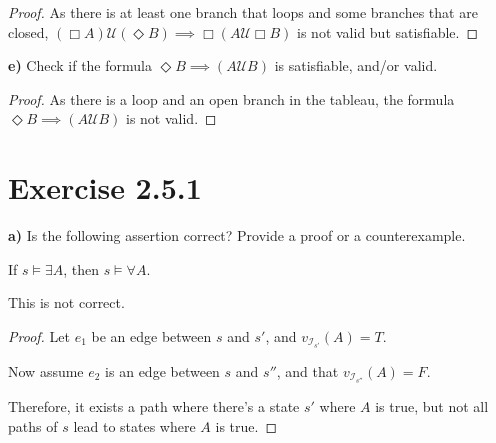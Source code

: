 \documentclass[titlepage, letterpaper, fleqn]{article}
\newcommand{\spacepls}{\vspace{5mm}}
\newcommand{\until}{\mathscr{U}}
\begin{document}
\begin{proof}
As there is at least one branch that loops and some branches that are closed, \((\Box A)\until(\Diamond B) \implies \Box(A \until \Box B)\)
is not valid but satisfiable.
\end{proof}

\pagebreak

{\large \textbf{e)} Check if the formula \(\Diamond B \implies (A \until B)\) is satisfiable, and/or valid.}

\spacepls


\begin{proof}
As there is a loop and an open branch in the tableau, the formula \(\Diamond B \implies (A \until B)\) is not valid.
\end{proof}

\section{Exercise 2.5.1}

{\large \textbf{a)} Is the following assertion correct? Provide a proof or a counterexample.

If \(s \models \exists A\), then \(s \models \forall A\).}

\spacepls

This is not correct.
\begin{proof}
Let \(e_1\) be an edge between \(s\) and \(s'\), and \(v_{\mathscr{I}_{s'}}(A) = T\).

Now assume \(e_2\) is an edge between \(s\) and \(s''\), and that \(v_{\mathscr{I}_{s''}}(A) = F\).

Therefore, it exists a path where there's a state \(s'\) where \(A\) is true, but not all paths of \(s\) lead to states where \(A\) is true.
\end{proof}
\end{document}
